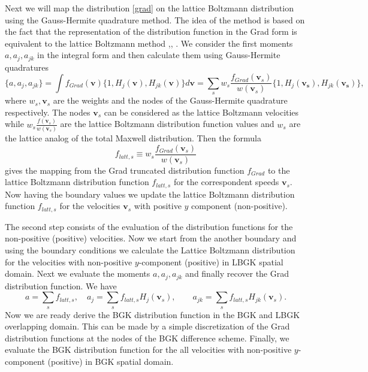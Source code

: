 \documentclass[]{elsarticle} %
\begin{document}
{Next we will map the distribution \eqref{grad} on the lattice Boltzmann distribution using  the  Gauss-Hermite quadrature method.
The idea of the method is based on the fact  that the representation of the distribution function in the  Grad form  is equivalent to the  lattice  Boltzmann method \cite{He1997},\cite{Shan1998}, \cite{Shan2006}.
We  consider the first moments $a,a_j,a_{jk}$  in the integral form and then calculate them using Gauss-Hermite quadratures
$$
\{a,a_j,a_{jk}\}=\int f_{Grad}(\mathbf{v})\{1,H_j(\mathbf{v}),H_{jk}(\mathbf{v})\}d\mathbf{v}=\sum_{s}w_s\frac{f_{Grad}(\mathbf{v}_s)}{w(\mathbf{v}_s)}
\{1,H_j(\mathbf{v_s}),H_{jk}(\mathbf{v_s})\},
$$
where $w_s, \mathbf{v}_s$  are the weights  and the  nodes of the Gauss-Hermite quadrature respectively. The  nodes $\mathbf{v}_s$  can be  considered as  the  lattice Boltzmann velocities while $ w_s\frac{f(\mathbf{v}_s)}{w(\mathbf{v}_s)}$ are the lattice Boltzmann distribution function values and
$w_s$ are the  lattice analog of the total Maxwell distribution.  Then the  formula
\begin{equation}\label{grad_to_latt}
f_{latt,s}\equiv w_s\frac{f_{Grad}(\mathbf{v}_s)}{w(\mathbf{v}_s)}
\end{equation}
gives  the mapping from  the Grad truncated distribution function $f_{Grad}$ to the lattice Boltzmann distribution function $f_{latt,s}$ for the correspondent speeds $\mathbf{v}_s$. Now having  the  boundary values we  update the lattice Boltzmann distribution function $f_{latt,s}$  for the  velocities $\mathbf{v}_s$  with positive  $y$  component (non-positive).

The  second  step consists of the evaluation of the  distribution functions for the non-positive  (positive) velocities. Now we  start
from the  another boundary and using  the  boundary  conditions  we calculate the Lattice  Boltzmann distribution for the velocities with non-positive  $y$-component (positive) in LBGK spatial domain. Next we evaluate the moments $a,a_j,a_{jk}$ and finally  recover  the  Grad  distribution function. We have
$$
a=\sum_sf_{latt,s}, \quad a_j=\sum_sf_{latt,s}H_j(\mathbf{v}_s), \quad  \quad a_{jk}=\sum_sf_{latt,s}H_{jk}(\mathbf{v}_s).
$$
Now  we  are ready derive the BGK distribution function in the  BGK and  LBGK  overlapping domain. This  can be made by a simple
discretization of the Grad distribution functions at  the  nodes  of the  BGK difference scheme. Finally, we evaluate the BGK distribution function for  the  all velocities  with non-positive  $y$-component (positive) in BGK spatial domain.


}
\end{document}
